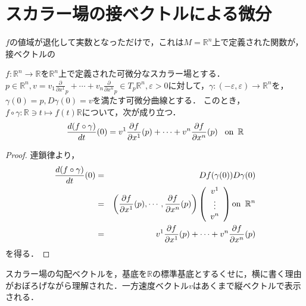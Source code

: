 \documentclass[uplatex, dvipdfmx]{jsreport}
\begin{document}
\section{スカラー場の接ベクトルによる微分}

$f$の値域が退化して実数となっただけで，これは$M=\mathbb{R}^n$上で定義された関数が，接ベクトルの
\begin{proposition}[スカラー場の接ベクトルによる微分]\label{prop-direction-derivative}
    $f:\mathbb{R}^n\to\mathbb{R}$を$\mathbb{R}^n$上で定義された可微分なスカラー場とする．$p\in\mathbb{R}^n, v=v_1\frac{\partial}{\partial x^1}_p + \cdots + v_n\frac{\partial}{\partial x^n}_p\in T_p\mathbb{R}^n, \varepsilon>0$に対して，$\gamma:(-\varepsilon,\varepsilon)\to\mathbb{R}^n$を，$\gamma(0)=p, D\gamma(0)=v$を満たす可微分曲線とする．
    このとき，$f\circ\gamma:\mathbb{R}\ni t\mapsto f(t)\mathbb{R}$について，次が成り立つ．
    \[ \frac{d(f\circ\gamma)}{dt}(0) = v^1\frac{\partial f}{\partial x^1}(p) + \cdots + v^n\frac{\partial f}{\partial x^n}(p) \hspace{3mm} \mathrm{on}\hspace{0.5em} \mathbb{R} \]
\end{proposition}
\begin{proof}
    連鎖律より，
    \begin{eqnarray*}
        \frac{d (f\circ\gamma)}{dt}(0) &=& Df(\gamma (0))D\gamma(0) \\
        &=& \left( \frac{\partial f}{\partial x^1}(p),\cdots,\frac{\partial f}{\partial x^n}(p) \right)\left( \begin{array}{c}
            v^1 \\ \vdots \\ v^n
        \end{array} \right) \mathrm{on}\hspace{0.5em}\mathbb{R}^n\\
        &=& v^1 \frac{\partial f}{\partial x^1}(p)+\cdots +v^n\frac{\partial f}{\partial x^n}(p)
    \end{eqnarray*}
    を得る．
\end{proof}
スカラー場の勾配ベクトルを，基底を$\mathbb{R}$の標準基底とするくせに，横に書く理由がおぼろげながら理解された．一方速度ベクトル$v$はあくまで縦ベクトルで表示される．
\end{document}
